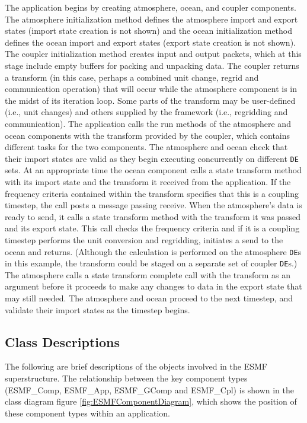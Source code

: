 The application begins by creating atmosphere, ocean, and coupler components.
The atmosphere initialization method defines the atmosphere import and export states
(import state creation is not shown) and the ocean initialization method defines
the ocean import and export states (export state creation is not shown).  The
coupler initialization method creates input and output packets, which at this
stage include empty buffers for packing and unpacking data.  The coupler returns a
transform (in this case, perhaps a combined unit change, regrid and communication 
operation) that will occur while the atmosphere 
component is in the midst of its iteration loop.  Some parts of the transform
may be user-defined (i.e., unit changes) and others supplied by the framework
(i.e., regridding and communication).  The application calls the run methods
of the atmosphere and ocean components with the transform provided by the coupler,
which contains different tasks for the two components.  The atmosphere and ocean 
check that their import states are valid as they begin executing concurrently on
different {\tt DE} sets.  At an appropriate time the
ocean component calls a state transform method with its import state and 
the transform it received from the application.  If the frequency criteria
contained within the transform specifies that this is a coupling timestep,
the call 
posts a message passing receive.  When the atmosphere's data is ready to send, 
it calls a state transform method with the transform it was passed and 
its export state.  This call checks the frequency criteria and if it is a 
coupling timestep performs
the unit conversion and regridding, initiates a send
to the ocean and returns.  (Although the calculation is performed on the atmosphere 
{\tt DE}s in this example, the transform could be staged on a separate set of coupler
{\tt DE}s.)  The atmosphere calls a state transform complete call with the transform
as an argument before it proceeds to make any changes to data in the export state
that may still needed.  The atmosphere and ocean proceed to the next 
timestep, and validate their import states as the timestep begins.  

\subsection{Class Descriptions}

The following are brief descriptions of the objects involved in the
ESMF superstructure. The relationship between the key component types (ESMF\_Comp, ESMF\_App, ESMF\_GComp and ESMF\_Cpl)
is shown in the 
class diagram figure \ref{fig:ESMFComponentDiagram}, which shows the position of these component 
types within an application.

